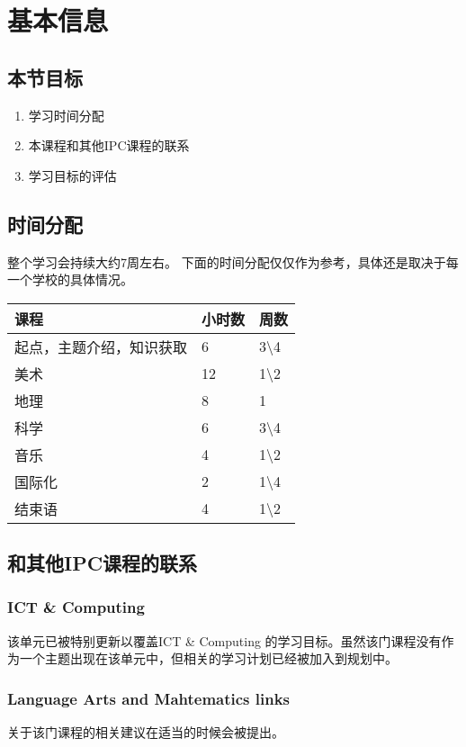 \chapter{基本信息}

\section{本节目标}
\begin{enumerate}
  \item 学习时间分配
  \item 本课程和其他IPC课程的联系
  \item 学习目标的评估
\end{enumerate}

\section{时间分配}
   整个学习会持续大约7周左右。
   下面的时间分配仅仅作为参考，具体还是取决于每一个学校的具体情况。
   
\begin{tabular}{l|l|l}
  \hline
  课程 & 小时数  &  周数\\
  \hline
  起点，主题介绍，知识获取 & 6 & 3\textbackslash4\\
  \hline
  美术 & 12 & 1\textbackslash2  \\
  \hline
  地理 & 8 & 1  \\
  \hline
  科学 & 6 & 3\textbackslash4  \\
  \hline
  音乐 & 4 & 1\textbackslash2  \\
  \hline
  国际化 & 2 & 1\textbackslash4  \\
  \hline
  结束语 & 4 & 1\textbackslash2  \\
  \hline
\end{tabular}


\section{和其他IPC课程的联系}
\subsection{ICT \& Computing}
  该单元已被特别更新以覆盖ICT \& Computing 的学习目标。虽然该门课程没有作为一个主题出现在该单元中，但相关的学习计划已经被加入到规划中。

\subsection{Language Arts and Mahtematics links}
  关于该门课程的相关建议在适当的时候会被提出。



